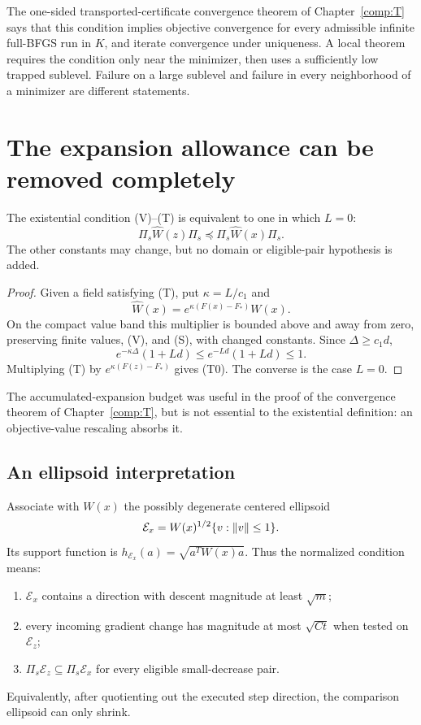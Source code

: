 The one-sided transported-certificate convergence theorem of Chapter~\ref{comp:T} says that this condition implies objective convergence for every admissible infinite full-BFGS run in $K$, and iterate convergence under uniqueness. A local theorem requires the condition only near the minimizer, then uses a sufficiently low trapped sublevel. Failure on a large sublevel and failure in every neighborhood of a minimizer are different statements.


\setcounter{section}{1}
\setcounter{theorem}{0}
\setcounter{equation}{1}


\section{The expansion allowance can be removed completely}

\begin{proposition}
The existential condition (V)--(T) is equivalent to one in which $L=0$:
\begin{equation}
 \Pi_s\widehat W(z)\Pi_s\preceq\Pi_s\widehat W(x)\Pi_s. \tag{5.T0}
\end{equation}
The other constants may change, but no domain or eligible-pair hypothesis is added.
\end{proposition}
\begin{proof}
Given a field satisfying (T), put $\kappa=L/c_1$ and
\[
 \widehat W(x)=e^{\kappa(F(x)-F_*)}W(x).
\]
On the compact value band this multiplier is bounded above and away from zero, preserving finite values, (V), and (S), with changed constants. Since $\Delta\ge c_1d$,
\[
 e^{-\kappa\Delta}(1+Ld)\le e^{-Ld}(1+Ld)\le1.
\]
Multiplying (T) by $e^{\kappa(F(z)-F_*)}$ gives (T0). The converse is the case $L=0$.
\end{proof}
The accumulated-expansion budget was useful in the proof of the convergence theorem of Chapter~\ref{comp:T}, but is not essential to the existential definition: an objective-value rescaling absorbs it.



\subsection{An ellipsoid interpretation}
Associate with $W(x)$ the possibly degenerate centered ellipsoid
\[
 \mathcal E_x=W(x)^{1/2}\{v:\left\|v\right\|\le1\}.
\]
Its support function is $h_{\mathcal E_x}(a)=\sqrt{a^TW(x)a}$. Thus the normalized condition means:
\begin{enumerate}[label=(\roman*),itemsep=3pt]
\item $\mathcal E_x$ contains a direction with descent magnitude at least $\sqrt m$;
\item every incoming gradient change has magnitude at most $\sqrt{Ct}$ when tested on $\mathcal E_z$;
\item $\Pi_s\mathcal E_z\subseteq\Pi_s\mathcal E_x$ for every eligible small-decrease pair.
\end{enumerate}
Equivalently, after quotienting out the executed step direction, the comparison ellipsoid can only shrink.

